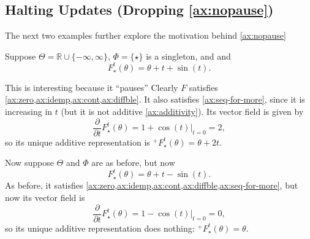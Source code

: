 \begin{subappendices}
    \begin{center}
    \end{center}


    \subsection{Halting Updates (Dropping \ref{ax:nopause})}
    The next two examples further explore the motivation behind \cref{ax:nopause}

    \begin{example}
    Suppose $\Theta = \mathbb R \cup \{-\infty, \infty\}$, $\Phi = \{\star\}$ is a singleton, and
    and 
    \[
        F^t_{\!\star}(\theta) = \theta + t + \sin(t).
    \]

    This is interesting because it ``pauses'' 
    Clearly $F$ satisfies \cref{ax:zero,ax:idemp,ax:cont,ax:diffble}.
    It also satisfies \cref{ax:seq-for-more}, since it is increasing in $t$
    (but it is not additive \cref{ax:additivity}).
    Its vector field is given by 
    \[
        \frac{\partial}{\partial t} F^t_{\!\star}(\theta) = 1 + \cos(t) \Big|_{t=0}
         = 2,
    \]
    so its unique additive representation is
    $
        {^+}F^t_{\!\star}(\theta) = \theta + 2 t.
    $
    \end{example}

    \begin{example}
    Now suppose $\Theta$ and $\Phi$ are as before,
    but now
    \[
        F^t_{\!\star}(\theta) = \theta + t - \sin(t).
    \]
    As before, it satisfies \cref{ax:zero,ax:idemp,ax:cont,ax:diffble,ax:seq-for-more},
    but now its vector field is
    \[
        \frac{\partial}{\partial t} F^t_{\!\star}(\theta) = 1 - \cos(t) \Big|_{t=0}
         = 0,
    \]
    so its unique additive representation does nothing:
    $
        {^+}F^t_{\!\star}(\theta) = \theta. 
    $
    \end{example}

    \subsection{}





\end{subappendices}
